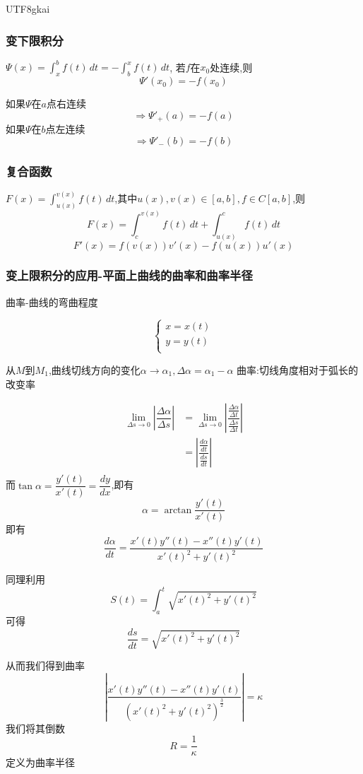 \documentclass{article}
\newcommand{\abs}[1]{\left|#1\right|}
\begin{document}
\begin{CJK}{UTF8}{gkai}
\subsubsection{变下限积分}

$\Psi(x) = \int_{x}^{b} f(t)\, dt = -\int_{b}^{x} f(t)\, dt $,
若$f$在$x_0$处连续,则
\[\Psi'(x_0) = -f(x_0)\]

如果$\Psi$在$a$点右连续\[\Rightarrow \Psi'_+(a) = -f(a)\]
如果$\Psi$在$b$点左连续\[\Rightarrow \Psi'_-(b) = -f(b)\]

\subsubsection{复合函数}
$F(x) = \int_{u(x)}^{v(x)} f(t)\, dt $,其中$u(x),v(x)\in[a,b],f\in C[a,b]$,则
\[F(x) = \int_{c}^{v(x)} f(t)\, dt + \int_{u(x)}^{c} f(t)\, dt\]
\[F'(x) = f(v(x)) v'(x) - f(u(x))u'(x)\]

\subsubsection{变上限积分的应用-平面上曲线的曲率和曲率半径}

曲率-曲线的弯曲程度

\begin{equation*}
  \begin{cases}
    x = x(t)\\
    y = y(t)\\
  \end{cases}
\end{equation*}

从$M$到$M_1$,曲线切线方向的变化$\alpha \to \alpha_1,\Delta \alpha = \alpha_1 - \alpha$
曲率:切线角度相对于弧长的改变率

\[
\begin{aligned}
\lim_{\Delta s \to 0}\abs{\dfrac{\Delta \alpha}{\Delta s}}
&= \lim_{\Delta s \to 0}\abs{\dfrac{\frac{\Delta \alpha}{\Delta t}}{\frac{\Delta s}{\Delta t}}}\\
&= \abs{\dfrac{\frac{d \alpha}{d t}}{\frac{d s}{d t}}}\\
\end{aligned}
\]
而$\tan \alpha = \dfrac{y'(t)}{x'(t)} = \dfrac{dy}{dx}$,即有
\[\alpha = \arctan \dfrac{y'(t)}{x'(t)}\]
即有\[\dfrac{d \alpha}{d t} =\dfrac{x'(t) y''(t) - x''(t) y'(t)}{x'(t)^2 + y'(t)^2}\]

同理利用\[S(t) = \int_{a}^{t} \sqrt{x'(t)^2 + y'(t)^2}\]
可得\[\dfrac{ds}{dt}= \sqrt{x'(t)^2 + y'(t)^2}\]

从而我们得到曲率
\[\abs{\dfrac{x'(t) y''(t) - x''(t) y'(t)}{(x'(t)^2 + y'(t)^2)^{\frac{3}{2}}} }= \kappa\] 
我们将其倒数
\[R = \dfrac{1}{\kappa}\]
定义为曲率半径\\


\end{CJK}
\end{document}
